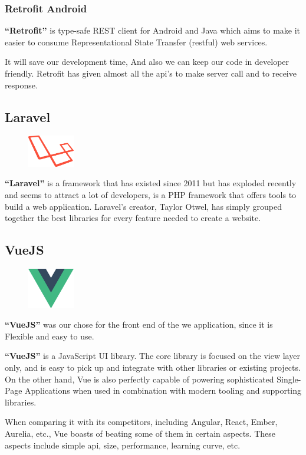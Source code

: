 \documentclass[12pt,a4paper]{report}
\begin{document}
	\subsubsection*{Retrofit Android}
	\textbf{``Retrofit''} is type-safe REST client for Android and Java which aims to make it easier to consume Representational State Transfer (\ac{rest}ful) web services. \par 
	It will save our development time, And also we can keep our code in developer friendly. Retrofit has given almost all the \ac{api}'s to make server call and to receive response.
	\clearpage
	\subsection{Laravel}
	\begin{figure}
		\centering
		\includegraphics[width=0.8in]{LaravelLogo.png}
	\end{figure}
	\textbf{``Laravel''} is a framework that has existed since 2011 but has exploded recently and seems to attract a lot of developers, is a PHP framework that offers tools to build a web application. Laravel's creator, Taylor Otwel, has simply grouped together the best libraries for every feature needed to create a website.
	\subsection{VueJS}
	\begin{figure}
		\centering
		\includegraphics[width=0.8in]{vue-logo.png}	
	\end{figure}
	\textbf{``VueJS''} was our chose for the front end of the we application, since it is Flexible and easy to use.\par 
	\textbf{``VueJS''} is a JavaScript UI library. The core library is focused on the view layer only, and is easy to pick up and integrate with other libraries or existing projects. On the other hand, Vue is also perfectly capable of powering sophisticated Single-Page Applications when used in combination with modern tooling and supporting libraries. 
	\par 
	When comparing it with its competitors, including Angular, React, Ember, Aurelia, etc., Vue boasts of beating some of them in certain aspects. These aspects include simple \ac{api}, size, performance, learning curve, etc.
\end{document}
